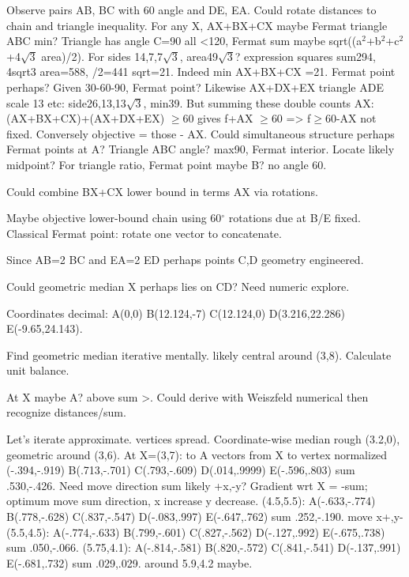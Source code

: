 \begin{decodedreasoningpanel}
Observe pairs AB, BC with 60 angle and DE, EA. Could rotate distances to chain and triangle inequality. For any X, AX+BX+CX maybe Fermat triangle ABC min? Triangle has angle C=90 all \textless{}120, Fermat sum maybe sqrt((a\ensuremath{^2}+b\ensuremath{^2}+c\ensuremath{^2}+4\ensuremath{\sqrt{3}} area)/2). For sides 14,7,7\ensuremath{\sqrt{3}}, area49\ensuremath{\sqrt{3}}? expression squares sum294, 4sqrt3 area=588, /2=441 sqrt=21. Indeed min AX+BX+CX =21. Fermat point perhaps? Given 30-60-90, Fermat point? Likewise AX+DX+EX triangle ADE scale 13 etc: side26,13,13\ensuremath{\sqrt{3}}, min39. But summing these double counts AX:
(AX+BX+CX)+(AX+DX+EX) \ensuremath{\geq}60 gives f+AX \ensuremath{\geq}60 =\textgreater{} f\ensuremath{\geq}60-AX not fixed. Conversely objective = those - AX. Could simultaneous structure perhaps Fermat points at A? Triangle ABC angle? max90, Fermat interior. Locate likely midpoint? For triangle ratio, Fermat point maybe B? no angle 60.

Could combine BX+CX lower bound in terms AX via rotations.

Maybe objective lower-bound chain using 60\ensuremath{^\circ} rotations due at B/E
  fixed. Classical Fermat point: rotate one vector to concatenate.

Since AB=2 BC and EA=2 ED perhaps points C,D geometry engineered.

Could geometric median X perhaps lies on CD? Need numeric explore.

Coordinates decimal:
A(0,0)
B(12.124,-7)
C(12.124,0)
D(3.216,22.286)
E(-9.65,24.143).

Find geometric median iterative mentally. likely central around (3,8). Calculate unit balance.

At X maybe A? above sum \textgreater{}.
Could derive with Weiszfeld numerical then recognize distances/sum.

Let's iterate approximate. vertices spread. Coordinate-wise median rough (3.2,0), geometric around (3,6).
At X=(3,7):
to A vectors from X to vertex normalized (-.394,-.919)
B(.713,-.701)
C(.793,-.609)
D(.014,.9999)
E(-.596,.803)
sum .530,-.426. Need move direction sum likely +x,-y? Gradient wrt X = -sum; optimum move sum direction, x increase y decrease. (4.5,5.5):
A(-.633,-.774)
B(.778,-.628)
C(.837,-.547)
D(-.083,.997)
E(-.647,.762)
sum .252,-.190. move x+,y-
(5.5,4.5):
A(-.774,-.633)
B(.799,-.601)
C(.827,-.562)
D(-.127,.992)
E(-.675,.738)
sum .050,-.066.
(5.75,4.1):
A(-.814,-.581)
B(.820,-.572)
C(.841,-.541)
D(-.137,.991)
E(-.681,.732)
sum .029,.029. around 5.9,4.2 maybe.


\end{decodedreasoningpanel}
